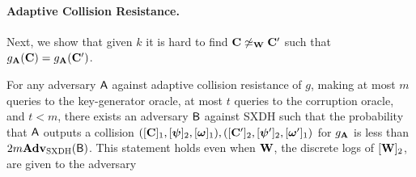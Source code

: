 \paragraph{Adaptive Collision Resistance.}
Next, we show that given $k$  it is hard to find $\mathbf{{C}}\not\simeq_{\mathbf{{W}}} \mathbf{{C}}'$ such that $g_{\mathbf{{A}}}(\mathbf{{C}})=g_{\mathbf{{A}}}(\mathbf{{C}}')$.
%
\begin{lemma} \label{lemma:g-cr-sxdh}
For any adversary $\mathsf{A}$ against adaptive collision resistance of $g$, making at most $m$  queries to the key-generator oracle, at most $t$ queries to the corruption oracle, and $t<m$, there exists an adversary $\mathsf{B}$ against SXDH such that the probability that $\mathsf{A}$ outputs a collision $([\mathbf{{C}}]_1,[{\boldsymbol{\psi}}]_2,[{\boldsymbol{\omega}}]_1),([\mathbf{{C}}']_2,[{\boldsymbol{\psi}}']_2,[{\boldsymbol{\omega}}']_1)$ for $g_{\mathbf{{A}}}$  is less than $2m \mathbf{Adv}_{\mathrm{SXDH}}(\mathsf{B})$. This statement holds even when $\mathbf{{W}}$, the discrete logs of $[\mathbf{{W}}]_2$, are given to the adversary 
\end{lemma}
